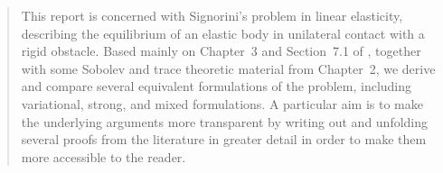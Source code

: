 \begin{abstract}
	This report is concerned with Signorini's problem in linear elasticity, describing the equilibrium of an elastic body in unilateral contact with a rigid obstacle. Based mainly on Chapter~3 and Section~7.1 of \cite{book}, together with some Sobolev and trace theoretic material from Chapter~2, we derive and compare several equivalent formulations of the problem, including variational, strong, and mixed formulations. A particular aim is to make the underlying arguments more transparent by writing out and unfolding several proofs from the literature in greater detail in order to make them more accessible to the reader.
\end{abstract}
